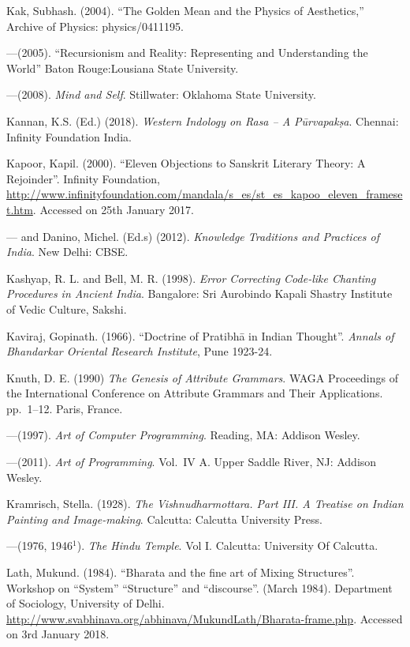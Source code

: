 \begin{thebibliography}{99}
Kak, Subhash. (2004). “The Golden Mean and the Physics of Aesthetics,” Archive of Physics: physics/0411195.

---\kern3pt(2005). “Recursionism and Reality: Representing and Understanding the World” Baton Rouge:Lousiana State University.

---\kern3pt(2008). \textsl{Mind and Self}. Stillwater: Oklahoma State University.

Kannan, K.S. (Ed.) (2018). \textsl{Western Indology on Rasa -- A Pūrvapakṣa}. Chennai: Infinity Foundation India.

Kapoor, Kapil. (2000). “Eleven Objections to Sanskrit Literary Theory: A Rejoinder”. Infinity Foundation, \url{http://www.infinityfoundation.com/mandala/s_es/st_es_kapoo_eleven_frameset.htm}. Accessed on 25th January 2017.

---\kern3pt and Danino, Michel. (Ed.s) (2012). \textsl{Knowledge Traditions and Practices of India}. New Delhi: CBSE.

Kashyap, R. L. and Bell, M. R. (1998). \textsl{Error Correcting Code-like Chanting Procedures in Ancient India}. Bangalore: Sri Aurobindo Kapali Shastry Institute of Vedic Culture, Sakshi.

Kaviraj, Gopinath. (1966). “Doctrine of Pratibhā in Indian Thought”. \textsl{Annals of Bhandarkar Oriental Research Institute}, Pune 1923-24.

Knuth, D. E. (1990) \textsl{The Genesis of Attribute Grammars}. WAGA Proceedings of the International Conference on Attribute Grammars and Their Applications. pp.~1--12. Paris, France.


---\kern3pt(1997). \textsl{Art of Computer Programming}. Reading, MA: Addison Wesley.

---\kern3pt(2011). \textsl{Art of Programming}. Vol.~IV A. Upper Saddle River, NJ: Addison Wesley.

Kramrisch, Stella. (1928). \textsl{The Vishnudharmottara. Part III. A Treatise on Indian Painting and Image-making}. Calcutta: Calcutta University Press.

---\kern3pt(1976, 1946$^{1}$). \textsl{The Hindu Temple}. Vol I. Calcutta: University Of Calcutta.

Lath, Mukund. (1984). “Bharata and the fine art of Mixing Structures”. Workshop on “System” “Structure” and “discourse”. (March 1984). Department of Sociology, University of Delhi. \url{http://www.svabhinava.org/abhinava/MukundLath/Bharata-frame.php}. Accessed on 3rd January 2018.


\end{thebibliography}
